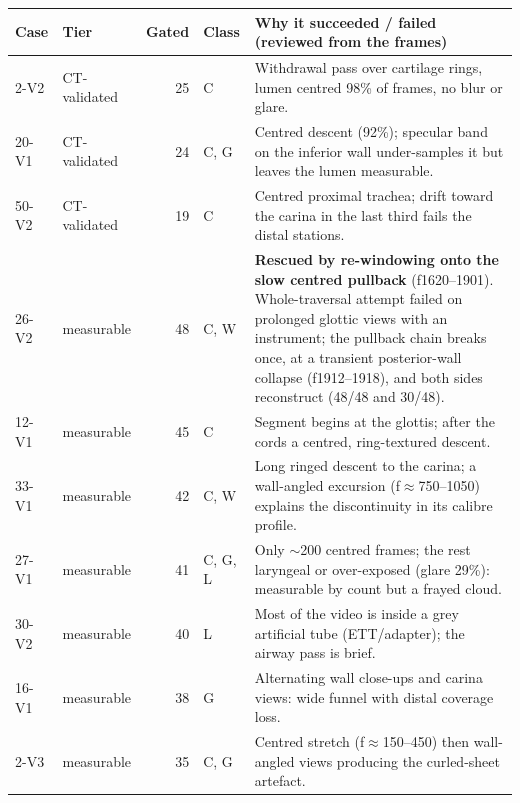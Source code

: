 \begin{tabular}{llrlp{8.6cm}}
\toprule
Case & Tier & Gated & Class & Why it succeeded / failed (reviewed from the frames) \\
\midrule
2-V2  & CT-validated & 25 & C & Withdrawal pass over cartilage rings, lumen centred 98\% of frames, no blur or glare. \\
20-V1 & CT-validated & 24 & C, G & Centred descent (92\%); specular band on the inferior wall under-samples it but leaves the lumen measurable. \\
50-V2 & CT-validated & 19 & C & Centred proximal trachea; drift toward the carina in the last third fails the distal stations. \\
\midrule
26-V2 & measurable & 48 & C, W & \textbf{Rescued by re-windowing onto the slow centred pullback} (f1620--1901). Whole-traversal attempt failed on prolonged glottic views with an instrument; the pullback chain breaks once, at a transient posterior-wall collapse (f1912--1918), and both sides reconstruct (48/48 and 30/48). \\
12-V1 & measurable & 45 & C & Segment begins at the glottis; after the cords a centred, ring-textured descent. \\
33-V1 & measurable & 42 & C, W & Long ringed descent to the carina; a wall-angled excursion (f$\approx$750--1050) explains the discontinuity in its calibre profile. \\
27-V1 & measurable & 41 & C, G, L & Only $\sim$200 centred frames; the rest laryngeal or over-exposed (glare 29\%): measurable by count but a frayed cloud. \\
30-V2 & measurable & 40 & L & Most of the video is inside a grey artificial tube (ETT/adapter); the airway pass is brief. \\
16-V1 & measurable & 38 & G & Alternating wall close-ups and carina views: wide funnel with distal coverage loss. \\
2-V3  & measurable & 35 & C, G & Centred stretch (f$\approx$150--450) then wall-angled views producing the curled-sheet artefact. \\

\end{tabular}
